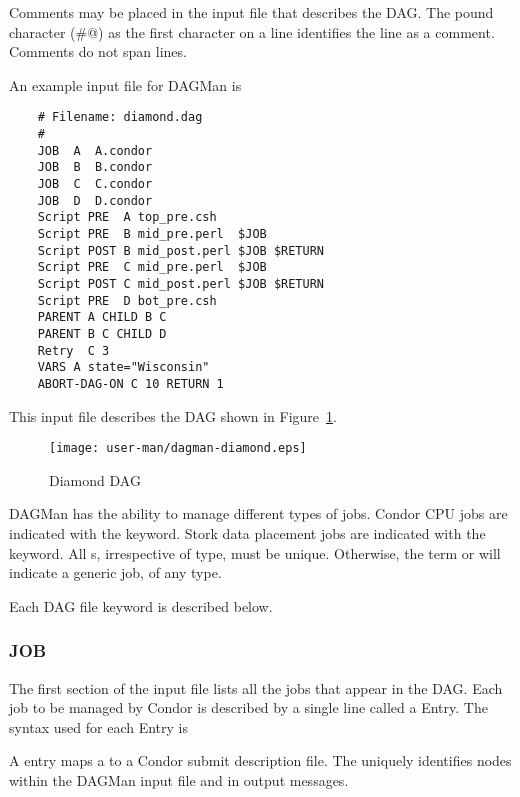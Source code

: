 Comments may be placed in the input file that describes the DAG.
The pound character (\verb@#@) as the first character on a
line identifies the line as a comment.
Comments do not span lines.

An example input file for DAGMan is

\footnotesize
\begin{verbatim}
    # Filename: diamond.dag
    #
    JOB  A  A.condor 
    JOB  B  B.condor 
    JOB  C  C.condor	
    JOB  D  D.condor
    Script PRE  A top_pre.csh
    Script PRE  B mid_pre.perl  $JOB
    Script POST B mid_post.perl $JOB $RETURN
    Script PRE  C mid_pre.perl  $JOB
    Script POST C mid_post.perl $JOB $RETURN
    Script PRE  D bot_pre.csh
    PARENT A CHILD B C
    PARENT B C CHILD D
    Retry  C 3
    VARS A state="Wisconsin"
    ABORT-DAG-ON C 10 RETURN 1
\end{verbatim}
\normalsize

This input file describes the DAG shown in 
Figure~\ref{fig:dagman-diamond}.

\begin{figure}[hbt]
\centering
\texttt{[image: user-man/dagman-diamond.eps]}
\caption{\label{fig:dagman-diamond}Diamond DAG}
\end{figure}

DAGMan has the ability to manage different types of jobs.  Condor CPU
jobs are indicated with the  keyword.  Stork data placement
jobs are indicated with the  keyword.  All s,
irrespective of type, must be unique.  Otherwise, the term 
or  will indicate a generic job, of any type.

Each DAG file keyword is described below.

\subsubsection{\label{dagman:JOB}JOB}

The first section of the input file lists
all the jobs that appear in the DAG.
Each job to be managed by Condor is described by a single line
called a  Entry.
The syntax used for each  Entry is

   

A  entry maps a  to a Condor submit description file.
The  uniquely identifies nodes within the
DAGMan input file and in output messages.

